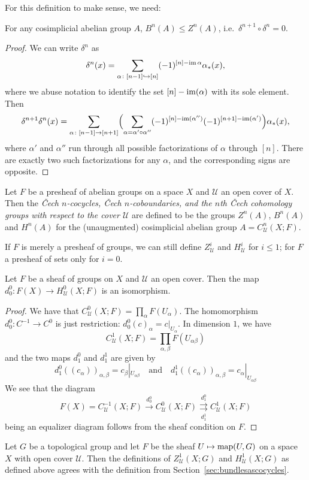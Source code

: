 \documentclass[a4paper,openany]{scrbook}
\begin{document}
For this definition to make sense, we need:
\begin{lemma}\label{lemma:deltadeltanull}
For any cosimplicial abelian group $A$, $B^n(A)\leq Z^n(A)$, i.e.\ $\delta^{n+1}\circ\delta^n=0$. 
\end{lemma}
\begin{proof}
We can write $\delta^n$ as
\[
\delta^n(x) = \sum_{\alpha\colon [n-1] \hookrightarrow [n]} (-1)^{[n]-\operatorname{im} \alpha} \alpha_*(x),
\]
where we abuse notation to identify the set $[n]-\operatorname{im}(\alpha)$ with its sole element. Then
\[
\delta^{n+1}\delta^n(x) = \sum_{\alpha\colon [n-1] \to [n+1]} \Bigl(\sum_{\alpha=\alpha'\circ\alpha''} (-1)^{[n]-\operatorname{im}(\alpha'')}(-1)^{[n+1]-\operatorname{im}(\alpha')}\Bigr) \alpha_*(x),
\]
where $\alpha'$ and $\alpha''$ run through all possible factorizations of $\alpha$ through $[n]$. There are exactly two such factorizations for any $\alpha$, and the corresponding signs are opposite.
\end{proof}

\begin{defn}
Let $F$ be a presheaf of abelian groups on a space $X$ and $\mathcal U$ an open cover of $X$. Then the \emph{Čech $n$-cocycles, Čech $n$-coboundaries, and the $n$th Čech cohomology groups with respect to the cover $\mathcal U$} are defined to be the groups $Z^n(A)$, $B^n(A)$ and $H^n(A)$ for the (unaugmented) cosimplicial abelian group $A=C^n_{\mathcal U}(X;F)$.

If $F$ is merely a presheaf of groups, we can still define $Z^i_{\mathcal U}$ and $H^i_{\mathcal U}$ for $i \leq 1$; for $F$ a presheaf of sets only for $i=0$.
\end{defn}

\begin{lemma}\label{lemma:sheafcriterioncechcohomology}
Let $F$ be a sheaf of groups on $X$ and $\mathcal U$ an open cover. Then the map $d_0^0 \colon F(X) \to H^0_{\mathcal U}(X;F)$ is an isomorphism. 
\end{lemma}
\begin{proof}
We have that $C^{0}_{\mathcal U}(X;F) = \prod_{\alpha} F(U_\alpha)$. The homomorphism $d^0_0\colon C^{-1} \to C^0$ is just restriction: $d^0_0(c)_{\alpha} = c|_{U_\alpha}$. In dimension $1$, we have
\[
C^1_{\mathcal U}(X;F) = \prod_{\alpha,\beta} F(U_{\alpha\beta})
\]
and the two maps $d^0_1$ and $d^1_1$ are given by
\[
d^0_1((c_\alpha))_{\alpha,\beta} = c_\beta|_{U_{\alpha\beta}} \quad \text{and} \quad d^1_1((c_\alpha))_{\alpha,\beta} = c_\alpha|_{U_{\alpha\beta}}
\]
We see that the diagram
\[
F(X)=C^{-1}_{\mathcal U}(X;F) \xrightarrow{d^{0}_0} C^{0}_{\mathcal U}(X;F) \overset{d^0_1}{\underset{d^1_1}{\rightrightarrows}} C^1_{\mathcal U}(X;F)
\]
being an equalizer diagram follows from the sheaf condition on $F$.
\end{proof}
\begin{exer}
	Let $G$ be a topological group and let $F$ be the sheaf $U \mapsto \operatorname{map}(U,G)$ on a space $X$ with open cover $\mathcal{U}$. Then the definitions of $Z^1_{\mathcal U}(X;G)$ and $H^1_{\mathcal{U}}(X;G)$ as defined above agrees with the definition from Section~\ref{sec:bundlesascocycles}.
\end{exer}	
	
\end{document}
